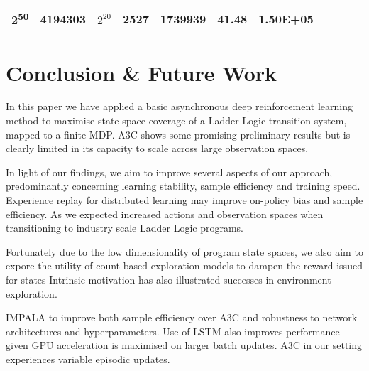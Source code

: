 \documentclass[runningheads]{llncs}
\begin{document}
\begin{table}[h]
\begin{tabular}{|c|c|c!{\color{black}\vrule}c|c|c|c|}
		\hline
		{}2\textsuperscript{50}                                                           & 4194303                                                                                                                    & {}$2^{20}$          & 2527                                                       & {}1739939                                                                                                                                                      & 41.48                                                      & {}1.50E+05                                                                                                                                                      \\
		\hline
	\end{tabular}
	\label{tab:results}
\end{table}



\section{Conclusion \& Future Work }
In this paper we have applied a basic asynchronous deep reinforcement learning method to maximise state space coverage of a Ladder Logic transition system, mapped to a finite MDP. A3C shows some promising preliminary results but is clearly limited in its capacity to scale across large observation spaces. 

In light of our findings, we aim to improve several aspects of our approach, predominantly concerning learning stability, sample efficiency and training speed. Experience replay for distributed learning may improve on-policy bias and sample efficiency. As we expected increased actions and observation spaces  when transitioning to industry scale Ladder Logic programs. 

Fortunately due to the low dimensionality of program state spaces, we also aim to expore the utility of count-based exploration models to dampen the reward issued for states Intrinsic motivation has also illustrated successes in environment exploration.

IMPALA \cite{espeholt2018impala} to improve both sample efficiency over A3C and robustness to network architectures and hyperparameters. Use of LSTM also improves performance given GPU acceleration is maximised on larger batch updates. A3C in our setting experiences variable episodic updates.


 
%
%


%
% 
% 
%
\end{document}
